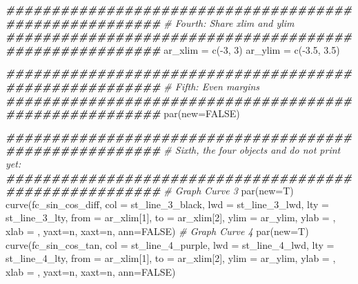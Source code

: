\documentclass[
]{book}
\newenvironment{Shaded}{\begin{snugshade}}{\end{snugshade}}
\newcommand{\AttributeTok}[1]{\textcolor[rgb]{0.77,0.63,0.00}{#1}}
\newcommand{\CommentTok}[1]{\textcolor[rgb]{0.56,0.35,0.01}{\textit{#1}}}
\newcommand{\ConstantTok}[1]{\textcolor[rgb]{0.00,0.00,0.00}{#1}}
\newcommand{\DecValTok}[1]{\textcolor[rgb]{0.00,0.00,0.81}{#1}}
\newcommand{\DocumentationTok}[1]{\textcolor[rgb]{0.56,0.35,0.01}{\textbf{\textit{#1}}}}
\newcommand{\FloatTok}[1]{\textcolor[rgb]{0.00,0.00,0.81}{#1}}
\newcommand{\FunctionTok}[1]{\textcolor[rgb]{0.00,0.00,0.00}{#1}}
\newcommand{\NormalTok}[1]{#1}
\newcommand{\OtherTok}[1]{\textcolor[rgb]{0.56,0.35,0.01}{#1}}
\newcommand{\SpecialCharTok}[1]{\textcolor[rgb]{0.00,0.00,0.00}{#1}}
\newcommand{\StringTok}[1]{\textcolor[rgb]{0.31,0.60,0.02}{#1}}
\begin{document}
\begin{Shaded}
\begin{Highlighting}[]
\DocumentationTok{\#\#\#\#\#\#\#\#\#\#\#\#\#\#\#\#\#\#\#\#\#\#\#\#\#\#\#\#\#\#\#\#\#\#\#\#\#\#\#\#\#\#\#\#\#\#\#\#\#\#\#\#\#\#\#}
\CommentTok{\# Fourth: Share xlim and ylim}
\DocumentationTok{\#\#\#\#\#\#\#\#\#\#\#\#\#\#\#\#\#\#\#\#\#\#\#\#\#\#\#\#\#\#\#\#\#\#\#\#\#\#\#\#\#\#\#\#\#\#\#\#\#\#\#\#\#\#\#}
\NormalTok{ar\_xlim }\OtherTok{=} \FunctionTok{c}\NormalTok{(}\SpecialCharTok{{-}}\DecValTok{3}\NormalTok{, }\DecValTok{3}\NormalTok{)}
\NormalTok{ar\_ylim }\OtherTok{=} \FunctionTok{c}\NormalTok{(}\SpecialCharTok{{-}}\FloatTok{3.5}\NormalTok{, }\FloatTok{3.5}\NormalTok{)}

\DocumentationTok{\#\#\#\#\#\#\#\#\#\#\#\#\#\#\#\#\#\#\#\#\#\#\#\#\#\#\#\#\#\#\#\#\#\#\#\#\#\#\#\#\#\#\#\#\#\#\#\#\#\#\#\#\#\#\#}
\CommentTok{\# Fifth: Even margins}
\DocumentationTok{\#\#\#\#\#\#\#\#\#\#\#\#\#\#\#\#\#\#\#\#\#\#\#\#\#\#\#\#\#\#\#\#\#\#\#\#\#\#\#\#\#\#\#\#\#\#\#\#\#\#\#\#\#\#\#}
\FunctionTok{par}\NormalTok{(}\AttributeTok{new=}\ConstantTok{FALSE}\NormalTok{)}

\DocumentationTok{\#\#\#\#\#\#\#\#\#\#\#\#\#\#\#\#\#\#\#\#\#\#\#\#\#\#\#\#\#\#\#\#\#\#\#\#\#\#\#\#\#\#\#\#\#\#\#\#\#\#\#\#\#\#\#}
\CommentTok{\# Sixth, the four objects and do not print yet:}
\DocumentationTok{\#\#\#\#\#\#\#\#\#\#\#\#\#\#\#\#\#\#\#\#\#\#\#\#\#\#\#\#\#\#\#\#\#\#\#\#\#\#\#\#\#\#\#\#\#\#\#\#\#\#\#\#\#\#\#}
\CommentTok{\# Graph Curve 3}
\FunctionTok{par}\NormalTok{(}\AttributeTok{new=}\NormalTok{T)}
\FunctionTok{curve}\NormalTok{(fc\_sin\_cos\_diff,}
      \AttributeTok{col =}\NormalTok{ st\_line\_3\_black,}
      \AttributeTok{lwd =}\NormalTok{ st\_line\_3\_lwd, }\AttributeTok{lty =}\NormalTok{ st\_line\_3\_lty,}
      \AttributeTok{from =}\NormalTok{ ar\_xlim[}\DecValTok{1}\NormalTok{], }\AttributeTok{to =}\NormalTok{ ar\_xlim[}\DecValTok{2}\NormalTok{], }\AttributeTok{ylim =}\NormalTok{ ar\_ylim,}
      \AttributeTok{ylab =} \StringTok{\textquotesingle{}\textquotesingle{}}\NormalTok{, }\AttributeTok{xlab =} \StringTok{\textquotesingle{}\textquotesingle{}}\NormalTok{, }\AttributeTok{yaxt=}\StringTok{\textquotesingle{}n\textquotesingle{}}\NormalTok{, }\AttributeTok{xaxt=}\StringTok{\textquotesingle{}n\textquotesingle{}}\NormalTok{, }\AttributeTok{ann=}\ConstantTok{FALSE}\NormalTok{)}
\CommentTok{\# Graph Curve 4}
\FunctionTok{par}\NormalTok{(}\AttributeTok{new=}\NormalTok{T)}
\FunctionTok{curve}\NormalTok{(fc\_sin\_cos\_tan,}
      \AttributeTok{col =}\NormalTok{ st\_line\_4\_purple,}
      \AttributeTok{lwd =}\NormalTok{ st\_line\_4\_lwd, }\AttributeTok{lty =}\NormalTok{ st\_line\_4\_lty,}
      \AttributeTok{from =}\NormalTok{ ar\_xlim[}\DecValTok{1}\NormalTok{], }\AttributeTok{to =}\NormalTok{ ar\_xlim[}\DecValTok{2}\NormalTok{], }\AttributeTok{ylim =}\NormalTok{ ar\_ylim,}
      \AttributeTok{ylab =} \StringTok{\textquotesingle{}\textquotesingle{}}\NormalTok{, }\AttributeTok{xlab =} \StringTok{\textquotesingle{}\textquotesingle{}}\NormalTok{, }\AttributeTok{yaxt=}\StringTok{\textquotesingle{}n\textquotesingle{}}\NormalTok{, }\AttributeTok{xaxt=}\StringTok{\textquotesingle{}n\textquotesingle{}}\NormalTok{, }\AttributeTok{ann=}\ConstantTok{FALSE}\NormalTok{)}
\end{Highlighting}
\end{Shaded}
\end{document}
